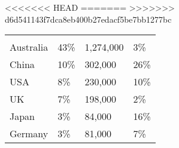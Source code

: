<<<<<<< HEAD
=======
>>>>>>> d6d541143f7dca8eb400b27edacf5be7bb1277bc
\begin{tabular}[t]{p{3cm}>{\hfill}p{1.3cm}>{\hfill}p{1.1cm}>{\hfill}p{1.7cm}}
      &   &     &    \\ 
 Australia & 43\% & 1,274,000 & 3\% \\ 
  China & 10\% &   302,000 & 26\% \\ 
  USA & 8\% &   230,000 & 10\% \\ 
  UK & 7\% &   198,000 & 2\% \\ 
  Japan & 3\% &    84,000 & 16\% \\ 
  Germany & 3\% &    81,000 & 7\% \\ 
  \end{tabular}
